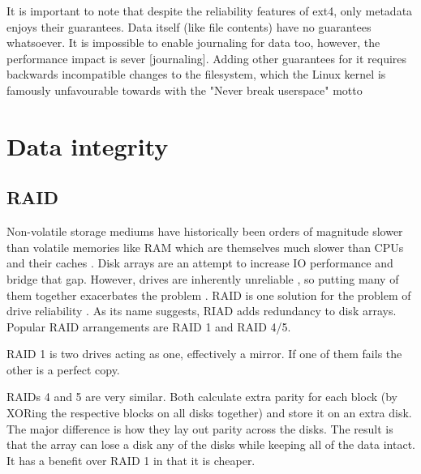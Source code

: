             It is important to note that despite the reliability features of
            ext4, only metadata enjoys their guarantees. Data itself (like file
            contents) have no guarantees whatsoever. It is impossible to enable
            journaling for data too, however, the performance impact is sever
            \cite{ext4_docs}[journaling]. Adding other guarantees for it
            requires backwards incompatible changes to the filesystem, which
            the Linux kernel is famously unfavourable towards with the "Never
            break userspace" motto \cite{never_break_userspace}

    \section{Data integrity}

        \subsection{RAID}

            Non-volatile storage mediums have historically been orders of
            magnitude slower than volatile memories like RAM which are
            themselves much slower than CPUs and their caches
            \cite{IO_bottleneck}. Disk arrays are an attempt to increase IO
            performance and bridge that gap. However, drives are inherently
            unreliable \cite{Backblaze_stats}, so putting many of them together
            exacerbates the problem \cite{RAID}. RAID is one solution for the
            problem of drive reliability \cite{RAID}. As its name suggests,
            RIAD adds redundancy to disk arrays. Popular RAID arrangements are
            RAID 1 and RAID 4/5.

            RAID 1 is two drives acting as one, effectively a mirror. If one of
            them fails the other is a perfect copy.

            RAIDs 4 and 5 are very similar. Both calculate extra parity for
            each block (by XORing the respective blocks on all disks together)
            and store it on an extra disk. The major difference is how they lay
            out parity across the disks. The result is that the array can lose
            a disk any of the disks while keeping all of the data intact. It
            has a benefit over RAID 1 in that it is cheaper.

